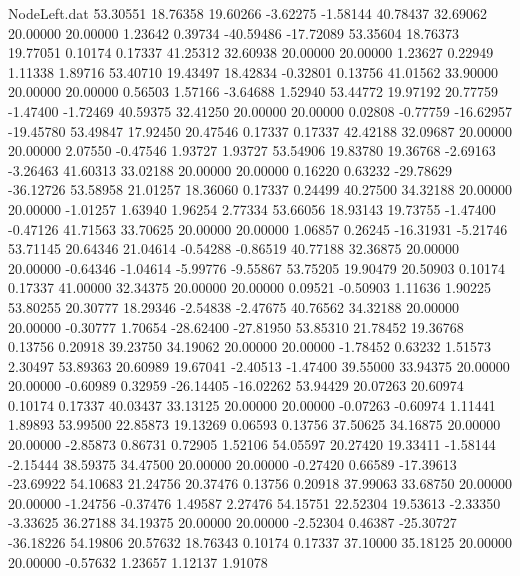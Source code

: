 \begin{filecontents}{NodeLeft.dat}
  53.30551   18.76358   19.60266    -3.62275   -1.58144   40.78437   32.69062   20.00000   20.00000    1.23642    0.39734  -40.59486  -17.72089
  53.35604   18.76373   19.77051     0.10174    0.17337   41.25312   32.60938   20.00000   20.00000    1.23627    0.22949    1.11338    1.89716
  53.40710   19.43497   18.42834    -0.32801    0.13756   41.01562   33.90000   20.00000   20.00000    0.56503    1.57166   -3.64688    1.52940
  53.44772   19.97192   20.77759    -1.47400   -1.72469   40.59375   32.41250   20.00000   20.00000    0.02808   -0.77759  -16.62957  -19.45780
  53.49847   17.92450   20.47546     0.17337    0.17337   42.42188   32.09687   20.00000   20.00000    2.07550   -0.47546    1.93727    1.93727
  53.54906   19.83780   19.36768    -2.69163   -3.26463   41.60313   33.02188   20.00000   20.00000    0.16220    0.63232  -29.78629  -36.12726
  53.58958   21.01257   18.36060     0.17337    0.24499   40.27500   34.32188   20.00000   20.00000   -1.01257    1.63940    1.96254    2.77334
  53.66056   18.93143   19.73755    -1.47400   -0.47126   41.71563   33.70625   20.00000   20.00000    1.06857    0.26245  -16.31931   -5.21746
  53.71145   20.64346   21.04614    -0.54288   -0.86519   40.77188   32.36875   20.00000   20.00000   -0.64346   -1.04614   -5.99776   -9.55867
  53.75205   19.90479   20.50903     0.10174    0.17337   41.00000   32.34375   20.00000   20.00000    0.09521   -0.50903    1.11636    1.90225
  53.80255   20.30777   18.29346    -2.54838   -2.47675   40.76562   34.32188   20.00000   20.00000   -0.30777    1.70654  -28.62400  -27.81950
  53.85310   21.78452   19.36768     0.13756    0.20918   39.23750   34.19062   20.00000   20.00000   -1.78452    0.63232    1.51573    2.30497
  53.89363   20.60989   19.67041    -2.40513   -1.47400   39.55000   33.94375   20.00000   20.00000   -0.60989    0.32959  -26.14405  -16.02262
  53.94429   20.07263   20.60974     0.10174    0.17337   40.03437   33.13125   20.00000   20.00000   -0.07263   -0.60974    1.11441    1.89893
  53.99500   22.85873   19.13269     0.06593    0.13756   37.50625   34.16875   20.00000   20.00000   -2.85873    0.86731    0.72905    1.52106
  54.05597   20.27420   19.33411    -1.58144   -2.15444   38.59375   34.47500   20.00000   20.00000   -0.27420    0.66589  -17.39613  -23.69922
  54.10683   21.24756   20.37476     0.13756    0.20918   37.99063   33.68750   20.00000   20.00000   -1.24756   -0.37476    1.49587    2.27476
  54.15751   22.52304   19.53613    -2.33350   -3.33625   36.27188   34.19375   20.00000   20.00000   -2.52304    0.46387  -25.30727  -36.18226
  54.19806   20.57632   18.76343     0.10174    0.17337   37.10000   35.18125   20.00000   20.00000   -0.57632    1.23657    1.12137    1.91078

\end{filecontents}
